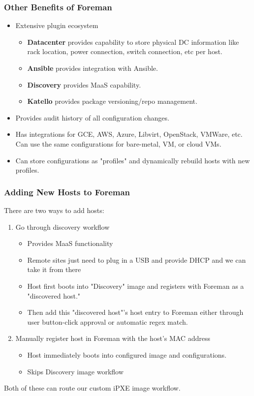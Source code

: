 \documentclass{beamer}
\begin{document}
\begin{frame}
 \frametitle{Other Benefits of Foreman}
 \begin{itemize}
  \item Extensive plugin ecosystem
        \begin{itemize}
         \item \textbf{Datacenter} provides capability to store physical DC information like rack location, power connection, switch connection, etc per host.
         \item \textbf{Ansible} provides integration with Ansible.
         \item \textbf{Discovery} provides MaaS capability.
         \item \textbf{Katello} provides package versioning/repo management.
        \end{itemize}
  \item Provides audit history of all configuration changes.
  \item Has integrations for GCE, AWS, Azure, Libvirt, OpenStack, VMWare, etc. Can use the same configurations for bare-metal, VM, or cloud VMs.
  \item Can store configurations as "profiles" and dynamically rebuild hosts with new profiles.
 \end{itemize}
\end{frame}

\begin{frame}
 \frametitle{Adding New Hosts to Foreman}
 There are two ways to add hosts:
 \begin{enumerate}
  \item Go through discovery workflow
        \begin{itemize}
         \item Provides MaaS functionality
         \item Remote sites just need to plug in a USB and provide DHCP and we can take it from there
         \item Host first boots into "Discovery" image and registers with Foreman as a "discovered host."
         \item Then add this "discovered host"'s host entry to Foreman either through user button-click approval or automatic regex match.
        \end{itemize}
  \item Manually register host in Foreman with the host's MAC address
        \begin{itemize}
         \item Host immediately boots into configured image and configurations.
         \item Skips Discovery image workflow
        \end{itemize}
 \end{enumerate}
 Both of these can route our custom iPXE image workflow.
\end{frame}
\end{document}
